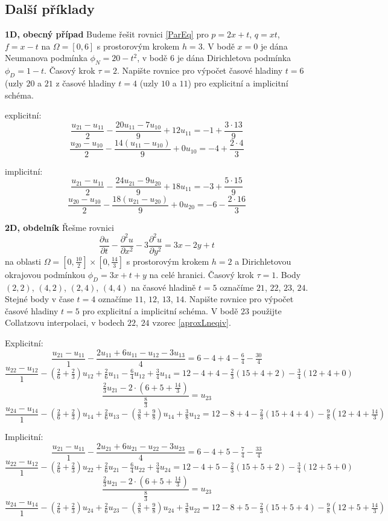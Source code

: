 \documentclass[a4paper,10pt]{article}
\def\prtl{\partial}                                        %
\begin{document}
\subsection{Další příklady}
{\bf 1D, obecný případ} Budeme řešit rovnici \eqref{ParEq} pro $p=2x+t$, $q=xt$, $f=x-t$ na $\Omega=[0,6]$ s prostorovým
krokem $h=3$. V bodě $x=0$ je dána Neumanova podmínka $\phi_N=20-t^2$, v bodě $6$ je dána Dirichletova podmínka
$\phi_D=1-t$. Časový krok $\tau=2$. Napište rovnice pro výpočet časové hladiny $t=6$ (uzly $20$ a $21$
z časové hladiny $t=4$ (uzly $10$ a $11$) pro explicitní a implicitní schéma.

explicitní:
\[
   \frac{u_{21}-u_{11}}{2}-\frac{20u_{11}-7u_{10}}{9}+12u_{11}=-1+\frac{3\cdot13}{9}
\]
\[
   \frac{u_{20}-u_{10}}{2}-\frac{14(u_{11}-u_{10})}{9}+0u_{10}=-4+\frac{2\cdot4}{3}
\]

implicitní:
\[
   \frac{u_{21}-u_{11}}{2}-\frac{24u_{21}-9u_{20}}{9}+18u_{11}=-3+\frac{5\cdot15}{9}
\]
\[
   \frac{u_{20}-u_{10}}{2}-\frac{18(u_{21}-u_{20})}{9}+0u_{20}=-6-\frac{2\cdot16}{3}
\]


{\bf 2D, obdelník} Řešme rovnici
\[
 \frac{\prtl u}{\prtl t} -\frac{\prtl^2 u}{\prtl x^2}-3\frac{\prtl^2 u}{\prtl y^2}=3x-2y+t
\]
na oblasti $\Omega=[0,\frac{10}{2}]\times[0,\frac{14}{3}]$ s prostorovým krokem $h=2$ a Dirichletovou okrajovou
podmínkou $\phi_D=3x+t+y$ na celé hranici. Časový krok $\tau=1$. Body $(2,2)$, $(4,2)$, $(2,4)$, $(4,4)$ 
na časové hladině $t=5$ označíme $21$, $22$, $23$, $24$. Stejné body v čase $t=4$ označíme 
$11$, $12$, $13$, $14$. Napište rovnice pro výpočet časové hladiny $t=5$ pro explicitní a implicitní schéma. 
V bodě $23$ použijte Collatzovu interpolaci, v bodech $22$, $24$ vzorec \eqref{aproxLneqiv}.

Explicitní:
\[
  \frac{u_{21}-u_{11}}{1}-\frac{2u_{11}+6u_{11}-u_{12}-3u_{13}}{4}=6-4+4-\tfrac64-\tfrac{30}{4}  
\]
\[
  \frac{u_{22}-u_{12}}{1}-(\tfrac26+\tfrac23)u_{12}+\tfrac26u_{11}-\tfrac64u_{12}+\tfrac34u_{14}
   =12-4+4-\tfrac23(15+4+2)-\tfrac{3}{4}(12+4+0)  
\]
\[
  \frac{\frac23u_{21}-2\cdot(6+5+\frac{14}{3})}{\frac83}=u_{23}  
\]
\[
  \frac{u_{24}-u_{14}}{1}-(\tfrac26+\tfrac23)u_{14}+\tfrac26u_{13}-(\tfrac38+\tfrac98)u_{14}+\tfrac38u_{12}
   =12-8+4-\tfrac23(15+4+4)-\tfrac98(12+4+\tfrac{14}{3})  
\]

Implicitní:
\[
  \frac{u_{21}-u_{11}}{1}-\frac{2u_{21}+6u_{21}-u_{22}-3u_{23}}{4}=6-4+5-\tfrac{7}{4}-\tfrac{33}{4}  
\]
\[
  \frac{u_{22}-u_{12}}{1}-(\tfrac26+\tfrac23)u_{22}+\tfrac26u_{21}-\tfrac64u_{22}+\tfrac34u_{24}
   =12-4+5-\tfrac23(15+5+2)-\tfrac34(12+5+0)  
\]
\[
  \frac{\frac23u_{21}-2\cdot(6+5+\frac{14}{3})}{\frac83}=u_{23}  
\]
\[
  \frac{u_{24}-u_{14}}{1}-(\tfrac26+\tfrac23)u_{24}+\tfrac26u_{23}-(\tfrac38+\tfrac98)u_{24}+\tfrac38u_{22}
   =12-8+5-\tfrac23(15+5+4)-\tfrac98(12+5+\tfrac{14}{3})  
\]
\end{document}
